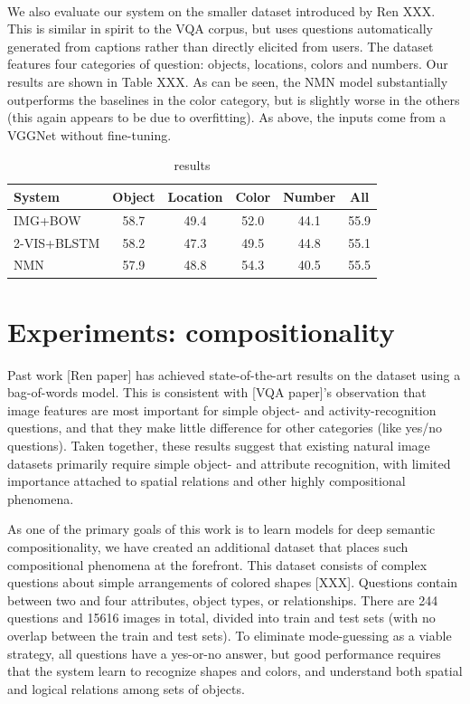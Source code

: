 \paragraph{\cocoqa}
We also evaluate our system on the smaller \cocoqa dataset introduced by Ren
XXX. This is similar in spirit to the VQA corpus, but uses questions
automatically generated from captions rather than directly elicited from users.
The \cocoqa dataset features four categories of question: objects, locations,
colors and numbers. Our results are shown in Table XXX. As can be seen, the NMN
model substantially outperforms the baselines in the color category, but is
slightly worse in the others (this again appears to be due to overfitting).
As above, the inputs come from a VGGNet without fine-tuning.

\begin{table}
  \footnotesize
  \center
  \begin{tabular}{lccccc}
    \toprule
    System & Object & Location & Color & Number & All \\
    \midrule
    IMG+BOW     & 58.7 & 49.4 & 52.0 & 44.1 & 55.9 \\
    2-VIS+BLSTM & 58.2 & 47.3 & 49.5 & 44.8 & 55.1 \\
    NMN         & 57.9 & 48.8 & 54.3 & 40.5 & 55.5 \\
    \bottomrule
  \end{tabular}
  \caption{\cocoqa results}
\end{table}

\section{Experiments: compositionality}

Past work [Ren paper] has achieved state-of-the-art results on the \cocoqa
dataset using a bag-of-words model. This is consistent with [VQA paper]'s
observation that image features are most important for simple object- and
activity-recognition questions, and that they make little difference for other
categories (like yes/no questions). Taken together, these results suggest that
existing natural image datasets primarily require simple object- and attribute
recognition, with limited importance attached to spatial relations and other
highly compositional phenomena.

As one of the primary goals of this work is to learn models for deep semantic
compositionality, we have created an additional dataset that places such
compositional phenomena at the forefront. This dataset consists of complex
questions about simple arrangements of colored shapes [XXX].  Questions contain
between two and four attributes, object types, or relationships.  There are 244
questions and 15616 images in total, divided into train and test sets (with no
overlap between the train and test sets).  To eliminate mode-guessing as a
viable strategy, all questions have a yes-or-no answer, but good performance
requires that the system learn to recognize shapes and colors, and understand
both spatial and logical relations among sets of objects.

